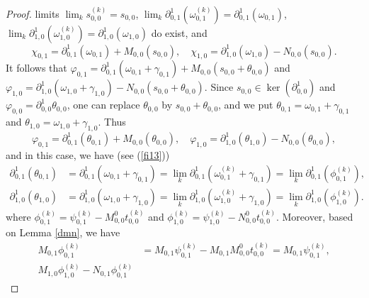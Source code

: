 \documentclass[12pt,reqno]{amsart}%
\theoremstyle{plain}
\numberwithin{theorem}{section} \numberwithin{equation}{section}
\numberwithin{lemma}{section}
\numberwithin{remark}{section}
\numberwithin{example}{section}
\numberwithin{proposition}{section}
\numberwithin{definition}{section}
\numberwithin{corollary}{section}
\begin{document}
\begin{proof}
limits $\lim_{k}s_{0,0}^{\left(  k\right)  }=s_{0,0}$, $\lim_{k}\partial
_{0,1}^{1}\left(  \omega_{0,1}^{\left(  k\right)  }\right)  =\partial
_{0,1}^{1}\left(  \omega_{0,1}\right)  $, $\lim_{k}\partial_{1,0}^{1}\left(
\omega_{1,0}^{\left(  k\right)  }\right)  =\partial_{1,0}^{1}\left(
\omega_{1,0}\right)  $ do exist, and
\[
\chi_{0,1}=\partial_{0,1}^{1}\left(  \omega_{0,1}\right)  +M_{0,0}\left(
s_{0,0}\right)  ,\quad\chi_{1,0}=\partial_{1,0}^{1}\left(  \omega
_{1,0}\right)  -N_{0,0}\left(  s_{0,0}\right)  .
\]
It follows that $\varphi_{0,1}=\partial_{0,1}^{1}\left(  \omega_{0,1}%
+\gamma_{0,1}\right)  +M_{0,0}\left(  s_{0,0}+\theta_{0,0}\right)  $ and
$\varphi_{1,0}=\partial_{1,0}^{1}\left(  \omega_{1,0}+\gamma_{1,0}\right)
-N_{0,0}\left(  s_{0,0}+\theta_{0,0}\right)  $. Since $s_{0,0}\in\ker\left(
\partial_{0,0}^{1}\right)  $ and $\varphi_{0,0}=\partial_{0,0}^{1}\theta
_{0,0}$, one can replace $\theta_{0,0}$ by $s_{0,0}+\theta_{0,0}$, and we put
$\theta_{0,1}=\omega_{0,1}+\gamma_{0,1}$ and $\theta_{1,0}=\omega_{1,0}%
+\gamma_{1,0}$. Thus
\[
\varphi_{0,1}=\partial_{0,1}^{1}\left(  \theta_{0,1}\right)  +M_{0,0}\left(
\theta_{0,0}\right)  ,\quad\varphi_{1,0}=\partial_{1,0}^{1}\left(
\theta_{1,0}\right)  -N_{0,0}\left(  \theta_{0,0}\right)  ,
\]
and in this case, we have (see (\ref{fi13}))
\begin{align*}
\partial_{0,1}^{1}\left(  \theta_{0,1}\right)   &  =\partial_{0,1}^{1}\left(
\omega_{0,1}+\gamma_{0,1}\right)  =\lim_{k}\partial_{0,1}^{1}\left(
\omega_{0,1}^{\left(  k\right)  }+\gamma_{0,1}\right)  =\lim_{k}\partial
_{0,1}^{1}\left(  \phi_{0,1}^{\left(  k\right)  }\right)  ,\\
\partial_{1,0}^{1}\left(  \theta_{1,0}\right)   &  =\partial_{1,0}^{1}\left(
\omega_{1,0}+\gamma_{1,0}\right)  =\lim_{k}\partial_{1,0}^{1}\left(
\omega_{1,0}^{\left(  k\right)  }+\gamma_{1,0}\right)  =\lim_{k}\partial
_{1,0}^{1}\left(  \phi_{1,0}^{\left(  k\right)  }\right)  .
\end{align*}
where $\phi_{0,1}^{\left(  k\right)  }=\psi_{0,1}^{\left(  k\right)  }%
-M_{0,0}^{0}t_{0,0}^{\left(  k\right)  }$ and $\phi_{1,0}^{\left(  k\right)
}=\psi_{1,0}^{\left(  k\right)  }-N_{0,0}^{0}t_{0,0}^{\left(  k\right)  }$.
Moreover, based on Lemma \ref{dmn}, we have
\begin{align*}
M_{0,1}\phi_{0,1}^{\left(  k\right)  }  &  =M_{0,1}\psi_{0,1}^{\left(
k\right)  }-M_{0,1}M_{0,0}^{0}t_{0,0}^{\left(  k\right)  }=M_{0,1}\psi
_{0,1}^{\left(  k\right)  },\\
M_{1,0}\phi_{1,0}^{\left(  k\right)  }-N_{0,1}\phi_{0,1}^{\left(  k\right)  }

\end{align*}
\end{proof}
\end{document}
